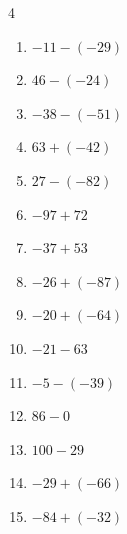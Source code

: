 \begin{multicols}{4}
\begin{enumerate}
        \phantom{$=-104$}

  \item $-11-(-29)$

        \phantom{$=18$}

  \item $46-(-24)$

        \phantom{$=70$}

  \item $-38-(-51)$

        \phantom{$=13$}

\columnbreak %

  \item $63+(-42)$

        \phantom{$=21$}

  \item $27-(-82)$

        \phantom{$=109$}

  \item $-97+72$

        \phantom{$=-25$}

  \item $-37+53$

        \phantom{$=16$}

  \item $-26+(-87)$

        \phantom{$=-113$}

  \item $-20+(-64)$

        \phantom{$=-84$}

  \item $-21-63$

        \phantom{$=-84$}

  \item $-5-(-39)$

        \phantom{$=34$}

  \item $86-0$

        \phantom{$=86$}

  \item $100-29$

        \phantom{$=71$}

  \item $-29+(-66)$

        \phantom{$=-95$}

  \item $-84+(-32)$

        \phantom{$=-116$}


\end{enumerate}
\end{multicols}

